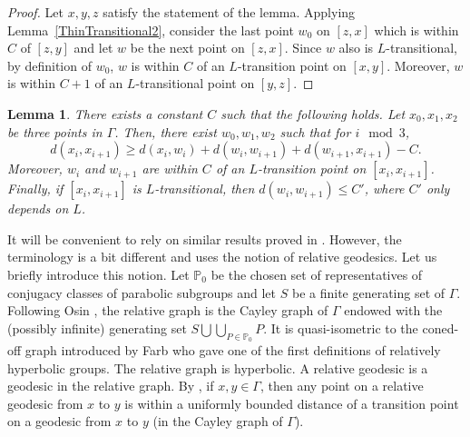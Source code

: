 \documentclass{amsart}
\newtheorem{lem}[thm]{Lemma}
\theoremstyle{definition}
\theoremstyle{remark}
\begin{document}
\begin{proof}
Let $x,y,z$ satisfy the statement of the lemma.
Applying Lemma~\ref{ThinTransitional2}, consider the last point $w_0$ on $[z,x]$ which is within $C$ of $[z,y]$ and let $w$ be the next point on $[z,x]$.
Since $w$ also is $L$-transitional, by definition of $w_0$, $w$ is within $C$ of an $L$-transition point on $[x,y]$.
Moreover, $w$ is within $C+1$ of an $L$-transitional point on $[y,z]$.
\end{proof}

\begin{lem}\label{existenceofcenter}
There exists a constant $C$ such that the following holds.
Let $x_0,x_1,x_2$ be three points in $\Gamma$.
Then, there exist $w_0,w_1,w_2$ such that for $i \mod 3$,
$$d(x_i,x_{i+1}) \geq d(x_i,w_i)+d(w_i,w_{i+1})+d(w_{i+1},x_{i+1})-C.$$
Moreover, $w_i$ and $w_{i+1}$ are within $C$ of an $L$-transition point on $[x_i,x_{i+1}]$.
Finally, if $[x_i,x_{i+1}]$ is $L$-transitional, then $d(w_i,w_{i+1})\leq C'$, where $C'$ only depends on $L$. 
\end{lem}

It will be convenient to rely on similar results proved in \cite{DussauleLLT1}.
However, the terminology is a bit different and \cite{DussauleLLT1} uses the notion of relative geodesics.
Let us briefly introduce this notion.
Let $\mathbb P_0$ be the chosen set of representatives of conjugacy classes of parabolic subgroups and let $S$ be a finite generating set of $\Gamma$.
Following Osin \cite{Osin}, the relative graph is the Cayley graph of $\Gamma$ endowed with the (possibly infinite) generating set $S\bigcup \bigcup_{P\in \mathbb P_0}P$.
It is quasi-isometric to the coned-off graph introduced by Farb \cite{Farb} who gave one of the first definitions of relatively hyperbolic groups.
The relative graph is hyperbolic.
A relative geodesic is a geodesic in the relative graph.
By \cite[Proposition~8.13]{Hruska}, if $x,y\in \Gamma$, then any point on a relative geodesic from $x$ to $y$ is within a uniformly bounded distance of a transition point on a geodesic from $x$ to $y$ (in the Cayley graph of $\Gamma$).
\end{document}
